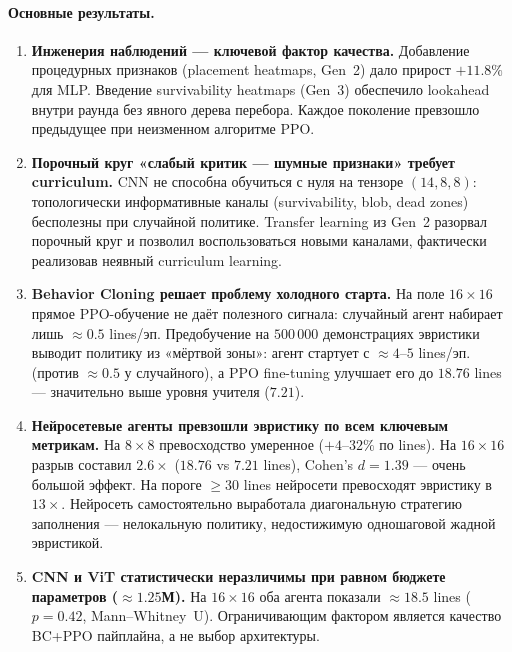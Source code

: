 \documentclass[12pt, a4paper]{article}
\begin{document}
\paragraph{Основные результаты.}

\begin{enumerate}
  \item \textbf{Инженерия наблюдений --- ключевой фактор качества.} Добавление процедурных признаков (placement heatmaps, Gen~2) дало прирост $+11.8\%$ для MLP. Введение survivability heatmaps (Gen~3) обеспечило lookahead внутри раунда без явного дерева перебора. Каждое поколение превзошло предыдущее при неизменном алгоритме PPO.

  \item \textbf{Порочный круг «слабый критик --- шумные признаки» требует curriculum.} CNN не способна обучиться с нуля на тензоре $(14,8,8)$: топологически информативные каналы (survivability, blob, dead zones) бесполезны при случайной политике. Transfer learning из Gen~2 разорвал порочный круг и позволил воспользоваться новыми каналами, фактически реализовав неявный curriculum learning.

  \item \textbf{Behavior Cloning решает проблему холодного старта.} На поле $16\times16$ прямое PPO-обучение не даёт полезного сигнала: случайный агент набирает лишь ${\approx}0.5$ lines/эп. Предобучение на $500\,000$ демонстрациях эвристики выводит политику из «мёртвой зоны»: агент стартует с ${\approx}4$--$5$ lines/эп. (против ${\approx}0.5$ у случайного), а PPO fine-tuning улучшает его до $18.76$ lines --- значительно выше уровня учителя ($7.21$).

  \item \textbf{Нейросетевые агенты превзошли эвристику по всем ключевым метрикам.} На $8\times8$ превосходство умеренное ($+4$--$32\%$ по lines). На $16\times16$ разрыв составил $2.6\times$ ($18.76$ vs $7.21$ lines), Cohen's $d=1.39$ --- очень большой эффект. На пороге $\geq30$ lines нейросети превосходят эвристику в $13\times$. Нейросеть самостоятельно выработала диагональную стратегию заполнения --- нелокальную политику, недостижимую одношаговой жадной эвристикой.

  \item \textbf{CNN и ViT статистически неразличимы при равном бюджете параметров (${\approx}1.25$М).} На $16\times16$ оба агента показали ${\approx}18.5$ lines ($p=0.42$, Mann--Whitney~U). Ограничивающим фактором является качество BC+PPO пайплайна, а не выбор архитектуры.
\end{enumerate}
\end{document}
